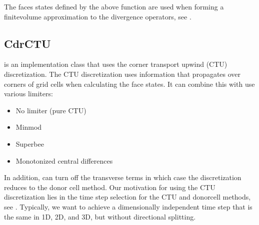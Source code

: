 \documentclass[letterpaper,10pt,english]{sphinxmanual}
\begin{document}
\begin{sphinxVerbatim}[commandchars=\\\{\},formatcom=\scriptsize]
           
\end{sphinxVerbatim}

The faces states defined by the above function are used when forming a finite\sphinxhyphen{}volume approximation to the divergence operators, see {\hyperref[\detokenize{Solvers/CDR:chap-cdrdetails}]{}}.


\subsection{CdrCTU}
\label{\detokenize{Solvers/CDR:cdrctu}}\label{\detokenize{Solvers/CDR:chap-cdrctu}}
 is an implementation class that uses the corner transport upwind (CTU) discretization.
The CTU discretization uses information that propagates over corners of grid cells when calculating the face states.
It can combine this with use various limiters:
\begin{itemize}
\item {} 
No limiter (pure CTU)

\item {} 
Minmod

\item {} 
Superbee

\item {} 
Monotonized central differences

\end{itemize}

In addition,  can turn off the transverse terms in which case the discretization reduces to the donor cell method.
Our motivation for using the CTU discretization lies in the time step selection for the CTU and donor\sphinxhyphen{}cell methods, see {\hyperref[\detokenize{Solvers/CDR:chap-ctustep}]{}}.
Typically, we want to achieve a dimensionally independent time step that is the same in 1D, 2D, and 3D, but without directional splitting.
\end{document}
